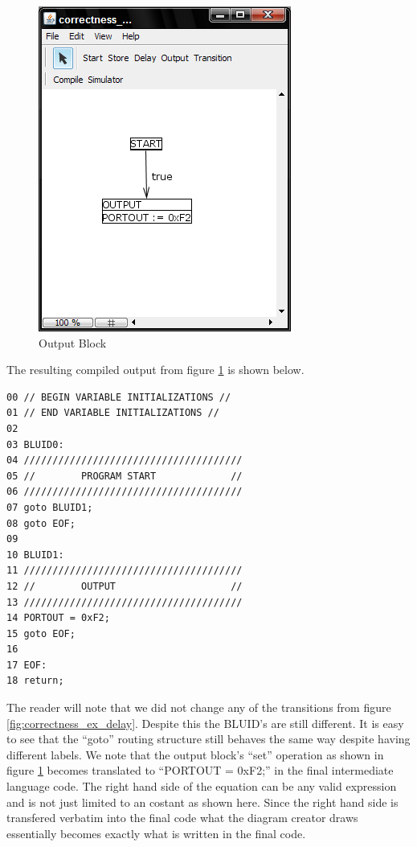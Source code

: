 \begin{figure}[htb]
	\centering
	\includegraphics[width=\imgmedphoto]{./images/correctness_ex_output.png}
	\caption{Output Block}
	\label{fig:correctness_ex_output}
\end{figure}

The resulting compiled output from figure \ref{fig:correctness_ex_output} is shown below.

\begin{minipage}{\textwidth}
\begin{lstlisting}[frame=single]
00 // BEGIN VARIABLE INITIALIZATIONS //
01 // END VARIABLE INITIALIZATIONS //
02 
03 BLUID0:
04 //////////////////////////////////////
05 //        PROGRAM START             //
06 //////////////////////////////////////
07 goto BLUID1;
08 goto EOF;
09 
10 BLUID1:
11 //////////////////////////////////////
12 //        OUTPUT                    //
13 //////////////////////////////////////
14 PORTOUT = 0xF2;
15 goto EOF;
16 
17 EOF:
18 return;
\end{lstlisting}
\end{minipage}

The reader will note that we did not change any of the transitions from figure \ref{fig:correctness_ex_delay}. Despite this the BLUID's are still different. It is easy to see that the ``goto'' routing structure still behaves the same way despite having different labels. We note that the output block's ``set'' operation as shown in figure \ref{fig:correctness_ex_output} becomes translated to ``PORTOUT = 0xF2;'' in the final intermediate language code. The right hand side of the equation can be any valid expression and is not just limited to an costant as shown here. Since the right hand side is transfered verbatim into the final code what the diagram creator draws essentially becomes exactly what is written in the final code.

